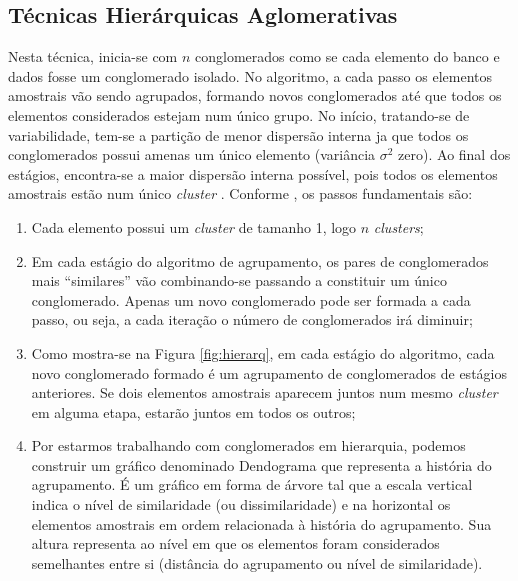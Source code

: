 \documentclass[
]{book}
\begin{document}
\hypertarget{tuxe9cnicas-hieruxe1rquicas-aglomerativas}{%
\subsection{Técnicas Hierárquicas Aglomerativas}\label{tuxe9cnicas-hieruxe1rquicas-aglomerativas}}

Nesta técnica, inicia-se com \(n\) conglomerados como se cada elemento do banco e dados fosse um conglomerado isolado. No algoritmo, a cada passo os elementos amostrais vão sendo agrupados, formando novos conglomerados até que todos os elementos considerados estejam num único grupo. No início, tratando-se de variabilidade, tem-se a partição de menor dispersão interna ja que todos os conglomerados possui amenas um único elemento (variância \(\sigma^2\) zero). Ao final dos estágios, encontra-se a maior dispersão interna possível, pois todos os elementos amostrais estão num único \emph{cluster} \citep{mingoti2007analise}. Conforme \citet{mingoti2007analise}, os passos fundamentais são:

\begin{enumerate}
\def\labelenumi{\arabic{enumi}.}
\item
  Cada elemento possui um \emph{cluster} de tamanho 1, logo \(n\) \emph{clusters};
\item
  Em cada estágio do algoritmo de agrupamento, os pares de conglomerados mais ``similares'' vão combinando-se passando a constituir um único conglomerado. Apenas um novo conglomerado pode ser formada a cada passo, ou seja, a cada iteração o número de conglomerados irá diminuir;
\item
  Como mostra-se na Figura \ref{fig:hierarq}, em cada estágio do algoritmo, cada novo conglomerado formado é um agrupamento de conglomerados de estágios anteriores. Se dois elementos amostrais aparecem juntos num mesmo \emph{cluster} em alguma etapa, estarão juntos em todos os outros;
\item
  Por estarmos trabalhando com conglomerados em hierarquia, podemos construir um gráfico denominado Dendograma que representa a história do agrupamento. É um gráfico em forma de árvore tal que a escala vertical indica o nível de similaridade (ou dissimilaridade) e na horizontal os elementos amostrais em ordem relacionada à história do agrupamento. Sua altura representa ao nível em que os elementos foram considerados semelhantes entre si (distância do agrupamento ou nível de similaridade).
\end{enumerate}
\end{document}
